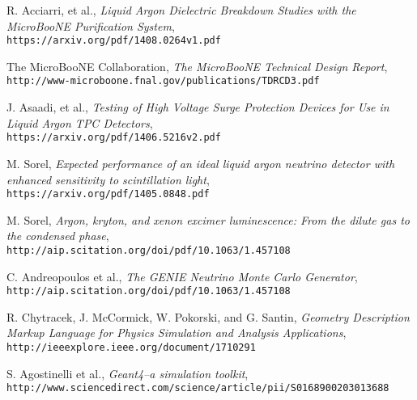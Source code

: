 \documentclass[12pt]{article}
\begin{document}
\begin{thebibliography}{20}
  R. Acciarri, et al., \emph{Liquid Argon Dielectric Breakdown Studies with the MicroBooNE Purification System}, \\
  \texttt{https://arxiv.org/pdf/1408.0264v1.pdf}

  The MicroBooNE Collaboration, \emph{The MicroBooNE Technical Design Report}, \\
  \texttt{http://www-microboone.fnal.gov/publications/TDRCD3.pdf}

  J. Asaadi, et al., \emph{Testing of High Voltage Surge Protection Devices for Use in Liquid Argon TPC Detectors}, \\
  \texttt{https://arxiv.org/pdf/1406.5216v2.pdf}

  M. Sorel, \emph{Expected performance of an ideal liquid argon neutrino detector with enhanced sensitivity to scintillation light}, \\
  \texttt{https://arxiv.org/pdf/1405.0848.pdf}

  M. Sorel, \emph{Argon, kryton, and xenon excimer luminescence: From the dilute gas to the condensed phase}, \\
  \texttt{http://aip.scitation.org/doi/pdf/10.1063/1.457108}

  C. Andreopoulos et al., \emph{The GENIE Neutrino Monte Carlo Generator}, \\
  \texttt{http://aip.scitation.org/doi/pdf/10.1063/1.457108}

  R. Chytracek, J. McCormick, W. Pokorski, and G. Santin, \emph{Geometry Description Markup Language for Physics Simulation and Analysis Applications}, \\
  \texttt{http://ieeexplore.ieee.org/document/1710291}

  S. Agostinelli et al., \emph{Geant4--a simulation toolkit},\\
  \texttt{http://www.sciencedirect.com/science/article/pii/S0168900203013688}



\end{thebibliography}
\end{document}
